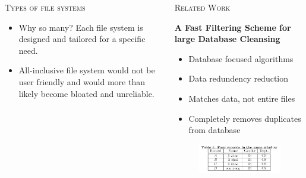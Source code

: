 \documentclass[final,t]{beamer}
\begin{document}
\begin{frame}{}
\begin{columns}[t]
\begin{column}{.325\linewidth}
\begin{block}{\textsc{Types of file systems}}
\begin{itemize}
          \end{itemize}         
		  
          \begin{itemize}

            \item Why so many? Each file system is designed and tailored for a specific need.
            
            \item All-inclusive file system would not be user friendly and would more than likely become bloated and unreliable.
          
          \end{itemize}         

	\end{block}
      \end{column}   
      
%
%
      \begin{column}{.325\linewidth}
   		
	\begin{block}{\textsc{Related Work}}

		\textbf{A Fast Filtering Scheme for large Database Cleansing \cite{a1}}
          \begin{itemize}
          
            \item Database focused algorithms

            \item Data redundency reduction
            
            \item Matches data, not entire files
            
            \item Completely removes duplicates from database
          
          \end{itemize} 
          
          \begin{figure}			
  	    \centering
            \includegraphics[scale=1.8]{duptable.JPG}
            \vspace*{.05in}
            

\end{figure}
\end{block}
\end{column}
\end{columns}
\end{frame}
\end{document}
